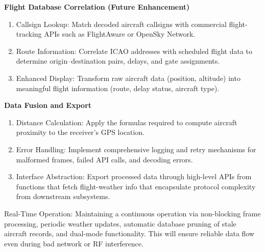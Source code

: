 \textbf{Flight Database Correlation (Future Enhancement)}
\begin{enumerate}
    \item Callsign Lookup: Match decoded aircraft callsigns with commercial flight-tracking APIs such as FlightAware or OpenSky Network.
    \item Route Information: Correlate ICAO addresses with scheduled flight data to determine origin–destination pairs, delays, and gate assignments.
    \item Enhanced Display: Transform raw aircraft data (position, altitude) into meaningful flight information (route, delay status, aircraft type).
\end{enumerate}

\textbf{Data Fusion and Export}
\begin{enumerate}
    \item Distance Calculation: Apply the formulas required to compute aircraft proximity to the receiver’s GPS location.
    \item Error Handling: Implement comprehensive logging and retry mechanisms for malformed frames, failed API calls, and decoding errors.
    \item Interface Abstraction: Export processed data through high-level APIs from functions that fetch flight-weather info that encapsulate protocol complexity from downstream subsystems.
\end{enumerate}
Real-Time Operation: Maintaining a continuous operation via non-blocking frame processing, periodic weather updates, automatic database pruning of stale aircraft records, and dual-mode functionality. This will ensure reliable data flow even during bad network or RF interference.
